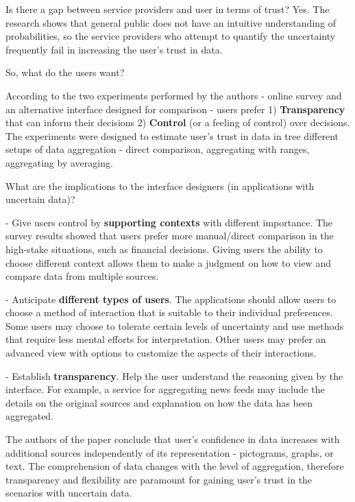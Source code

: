 \documentclass[12pt,letterpaper]{article}
\begin{document}
Is there a gap between service providers and user in terms of trust? Yes. The research shows that general public does not have an intuitive understanding of probabilities, so the service providers who attempt to quantify the uncertainty frequently fail in increasing the user's trust in data.

So, what do the users want? 

According to the two experiments performed by the authors - online survey and an alternative interface designed for comparison - users prefer 1) \textbf{Transparency} that can inform their decisions 2) \textbf{Control} (or a feeling of control) over decisions. The experiments were designed to estimate user's trust in data in tree different setups of data aggregation - direct comparison, aggregating with ranges, aggregating by averaging. 

What are the implications to the interface designers (in applications with uncertain data)?

\hspace{10mm} - Give users control by \textbf{supporting contexts} with different importance. The survey results showed that users prefer more manual/direct comparison in the high-stake situations, such as financial decisions. Giving users the ability to choose different context allows them to make a judgment on how to view and compare data from multiple sources.  

\hspace{10mm} - Anticipate \textbf{different types of users}. The applications should allow users to choose a method of interaction that is suitable to their individual preferences. Some users may choose to tolerate certain levels of uncertainty and use methods that require less mental efforts for interpretation. Other users may prefer an advanced view with options to customize the aspects of their interactions. 

\hspace{10mm} - Establish \textbf{transparency}. Help the user understand the reasoning given by the interface. For example, a service for aggregating news feeds may include the details on the original sources and explanation on how the data has been aggregated. 

The authors of the paper conclude that user's confidence in data increases with additional sources independently of its representation - pictograms, graphs, or text. The comprehension of data changes with the level of aggregation, therefore transparency and flexibility are paramount for gaining user's trust in the scenarios with uncertain data. 

 

\end{document}
